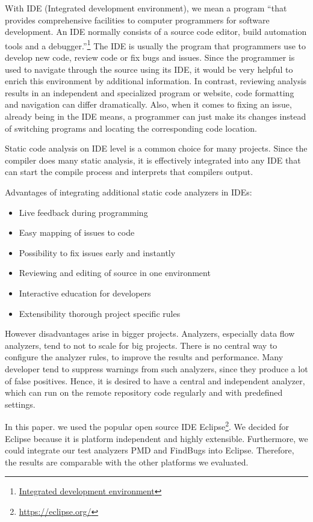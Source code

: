 \documentclass[conference]{IEEEtran}
\begin{document}
With IDE (Integrated development environment), we mean a program ``that provides comprehensive facilities to computer programmers for software development. An IDE normally consists of a source code editor, build automation tools and a debugger.''\footnote{\href{http://en.wikipedia.org/wiki/Integrated_development_environment}{Integrated development environment}}
The IDE is usually the program that programmers use to develop new code, review code or fix bugs and issues. Since the programmer is used to navigate through the source using its IDE, it would be very helpful to enrich this environment by additional information. In contrast, reviewing analysis results in an independent and specialized program or website, code formatting and navigation can differ dramatically. Also, when it comes to fixing an issue, already being in the IDE means, a programmer can just make its changes instead of switching programs and locating the corresponding code location.

Static code analysis on IDE level is a common choice for many projects. Since the compiler does many static analysis, it is effectively integrated into any IDE that can start the compile process and interprets that compilers output.

Advantages of integrating additional static code analyzers in IDEs:
\begin{itemize}
	\item Live feedback during programming
	\item Easy mapping of issues to code
	\item Possibility to fix issues early and instantly
	\item Reviewing and editing of source in one environment
	\item Interactive education for developers
	\item Extensibility thorough project specific rules
\end{itemize}

However disadvantages arise in bigger projects. Analyzers, especially data flow analyzers, tend to not to scale for big projects. 
There is no central way to configure the analyzer rules, to improve the results and performance.
Many developer tend to suppress warnings from such analyzers, since they produce a lot of false positives.
Hence, it is desired to have a central and independent analyzer, which can run on the remote repository code regularly and with predefined settings.

In this paper. we used the popular open source IDE Eclipse\footnote{\href{https://eclipse.org/}{https://eclipse.org/}}.
We decided for Eclipse because it is platform independent and highly extensible. Furthermore, we could integrate our test analyzers PMD and FindBugs into Eclipse. Therefore, the results are comparable with the other platforms we evaluated.
\end{document}
